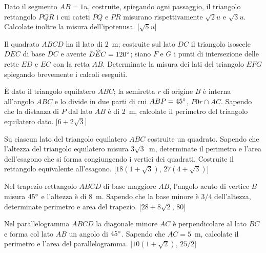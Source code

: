 \begin{multicols}{2}
\begin{esercizio}
\label{ese:7.23}
Dato il segmento $AB=1u$, costruite, spiegando ogni passaggio, il triangolo rettangolo $PQR$ i cui cateti $PQ$ e $PR$ misurano rispettivamente $\sqrt{2}u$ e $\sqrt{3}u$. Calcolate inoltre la misura dell'ipotenusa.
[$\sqrt{5}u$]
\end{esercizio}

\begin{esercizio}
\label{ese:7.24}
Il quadrato $ABCD$ ha il lato di 2~m; costruite sul lato $DC$ il triangolo isoscele $DEC$ di base $DC$ e avente $D\widehat{E}C=120{}^{\circ}$; siano $F$ e $G$ i punti di intersezione delle rette $ED$ e $EC$ con la retta $AB$. Determinate la misura dei lati del triangolo $EFG$ spiegando brevemente i calcoli eseguiti.
\end{esercizio}

\begin{esercizio}
\label{ese:7.25}
\`E dato il triangolo equilatero $ABC$; la semiretta $r$ di origine $B$ è interna all'angolo $ABC$ e lo divide in due parti di cui $ABP=45{}^{\circ}$, $P0r\cap AC$. Sapendo che la distanza di $P$ dal lato $AB$ è di 2~m, calcolate il perimetro del triangolo equilatero dato.
[$6+2\sqrt{3}$]
\end{esercizio}

\begin{esercizio}
\label{ese:7.26}
Su ciascun lato del triangolo equilatero $ABC$ costruite un quadrato. Sapendo che l'altezza del triangolo equilatero misura $3\sqrt{3}$~m, determinate il perimetro e l'area dell'esagono che si forma congiungendo i vertici dei quadrati. Costruite il rettangolo equivalente all'esagono.	[$18(1+\sqrt{3})$, $27(4+\sqrt{3})$]
\end{esercizio}

\begin{esercizio}
\label{ese:7.27}
Nel trapezio rettangolo $ABCD$ di base maggiore $AB$, l'angolo acuto di vertice $B$ misura $45{}^{\circ}$ e l'altezza è di 8~m. Sapendo che la base minore è $3/4$ dell'altezza, determinate perimetro e area del trapezio.
[$28+8\sqrt{2}$, 80]
\end{esercizio}

\begin{esercizio}
\label{ese:7.28}
Nel parallelogramma $ABCD$ la diagonale minore $AC$ è perpendicolare al lato $BC$ e forma col lato $AB$ un angolo di $45{}^{\circ}$. Sapendo che $AC=5$~m, calcolate il perimetro e l'area del parallelogramma.
[$10(1+\sqrt{2})$, $25/2$]
\end{esercizio}


\end{multicols}

